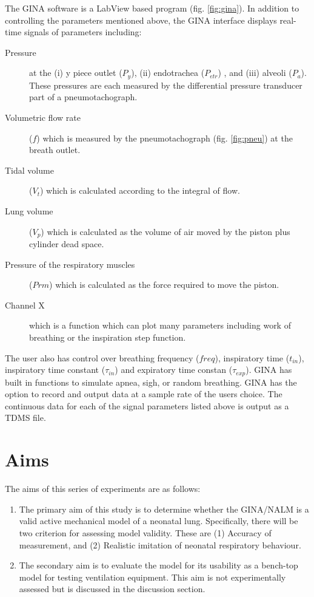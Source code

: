 \documentclass[12pt, openany, oneside]{book}
\begin{document}

The GINA software is a LabView based program (fig. \ref{fig:gina}). In addition to controlling the parameters mentioned above, the GINA interface displays real-time signals of parameters including: 
\begin{description}
\item [Pressure] at the (i) y piece outlet ($P_y$), (ii) endotrachea ($P_{etr}$) , and (iii) alveoli ($P_a$). These pressures are each measured by the differential pressure transducer part of a pneumotachograph.
\item [Volumetric flow rate] ($f$) which  is  measured by the pneumotachograph (fig. \ref{fig:pneu})  at the breath outlet.
\item [Tidal volume] ($V_t$) which  is calculated according to the integral of flow.
\item [Lung volume] ($V_p$) which is calculated as the volume of air moved by the piston plus cylinder dead space.
\item [Pressure of the respiratory muscles] ($Prm$) which is calculated as the force required to move the piston.
\item [Channel X] which is a function which can plot many parameters including work of breathing or the inspiration step function.
\end{description}

The user also has control over breathing frequency ($freq$), inspiratory time ($t_{in}$), inspiratory time constant ($\tau_{in}$) and expiratory time constan ($\tau_{exp}$). GINA has built in functions to simulate apnea, sigh, or random breathing. GINA has the option to record and output data at a sample rate of the users choice. The continuous data for each of the signal parameters listed above is output as a TDMS file.


\section{Aims}
The aims of this series of experiments are as follows:
\begin{enumerate}
\item 
The primary aim of this study is to determine whether the GINA/NALM is a valid active mechanical model of a neonatal lung. Specifically, there will be two criterion for assessing model validity. These are (1) Accuracy of measurement, and (2) Realistic imitation of neonatal respiratory behaviour.
\item The secondary aim is to evaluate the model for its usability as a bench-top model for testing ventilation equipment. This aim is not experimentally assessed but is discussed in the discussion section.
\end{enumerate}
\end{document}

